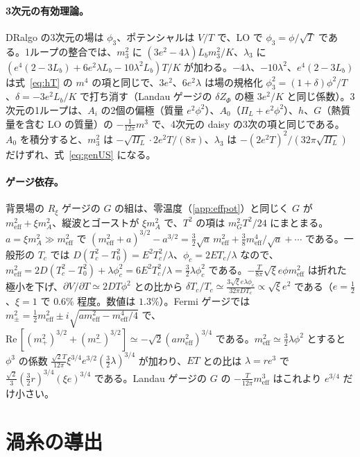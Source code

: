 \documentclass[a4paper,10pt]{ltjsarticle}
\newcommand{\re}{\mathrm{Re}\,}
\begin{document}
\paragraph{3次元の有効理論。}DRalgo の3次元の場は $\phi_3$、ポテンシャルは $V/T$ で、LO で $\phi_3=\phi/\sqrt T$ である。1ループの整合では、$m_3^2$ に $(3e^2-4\lambda)L_bm_3^2/K$、$\lambda_3$ に $(e^4(2-3L_b)+6e^2\lambda L_b-10\lambda^2L_b)T/K$ が加わる。$-4\lambda$、$-10\lambda^2$、$e^4(2-3L_b)$ は式~\eqref{eq:hT} の $m^4$ の項と同じで、$3e^2$、$6e^2\lambda$ は場の規格化 $\phi_3^2=(1+\delta)\phi^2/T$、$\delta=-3e^2L_b/K$ で打ち消す（Landau ゲージの $\delta Z_\Phi$ の極 $3e^2/K$ と同じ係数）。3次元の1ループは、$A_i$ の2個の偏極（質量 $e^2\phi^2$）、$A_0$（$\Pi_L+e^2\phi^2$）、$h$、$G$（熱質量を含む LO の質量）の $-\frac1{12\pi}m^3$ で、4次元の daisy の3次の項と同じである。$A_0$ を積分すると、$m_3^2$ は $-\sqrt{\Pi_L}\cdot2e^2T/(8\pi)$、$\lambda_3$ は $-(2e^2T)^2/(32\pi\sqrt{\Pi_L})$ だけずれ、式~\eqref{eq:genUS} になる。

\paragraph{ゲージ依存。}背景場の $R_\xi$ ゲージの $G$ の組は、零温度（\ref{app:effpot}）と同じく $G$ が $m_{\mathrm{eff}}^2+\xi m_A^2$、縦波とゴーストが $\xi m_A^2$ で、$T^2$ の項は $m_G^2T^2/24$ にまとまる。$a=\xi m_A^2\gg m_{\mathrm{eff}}^2$ で $(m_{\mathrm{eff}}^2+a)^{3/2}-a^{3/2}=\frac32\sqrt a\,m_{\mathrm{eff}}^2+\frac38m_{\mathrm{eff}}^4/\sqrt a+\cdots$ である。一般形の $T_c$ では $D(T_c^2-T_0^2)=E^2T_c^2/\lambda$、$\phi_c=2ET_c/\lambda$ なので、$m_{\mathrm{eff}}^2=2D(T_c^2-T_0^2)+\lambda\phi_c^2=6E^2T_c^2/\lambda=\frac32\lambda\phi_c^2$ である。$-\frac T{8\pi}\sqrt\xi e\phi m_{\mathrm{eff}}^2$ は折れた極小を下げ、$\partial V/\partial T\simeq2DT\phi^2$ との比から $\delta T_c/T_c\simeq\frac{3\sqrt\xi e\lambda\phi_c}{32\pi DT_c}\propto\sqrt\xi e^2$ である（$e=\frac12$、$\xi=1$ で $0.6\%$ 程度。数値は $1.3\%$）。Fermi ゲージでは $m_\pm^2=\frac12m_{\mathrm{eff}}^2\pm i\sqrt{am_{\mathrm{eff}}^2-m_{\mathrm{eff}}^4/4}$ で、$\re[(m_+^2)^{3/2}+(m_-^2)^{3/2}]\simeq-\sqrt2(am_{\mathrm{eff}}^2)^{3/4}$ である。$m_{\mathrm{eff}}^2\simeq\frac32\lambda\phi^2$ とすると $\phi^3$ の係数 $\frac{\sqrt2T}{12\pi}\xi^{3/4}e^{3/2}(\frac32\lambda)^{3/4}$ が加わり、$ET$ との比は $\lambda=re^3$ で $\frac{\sqrt2}3(\frac32r)^{3/4}(\xi e)^{3/4}$ である。Landau ゲージの $G$ の $-\frac T{12\pi}m_{\mathrm{eff}}^3$ はこれより $e^{3/4}$ だけ小さい。

\section{渦糸の導出}\label{app:vortex}
\end{document}

